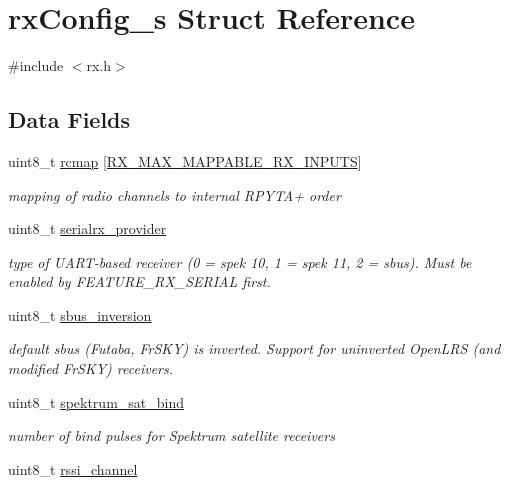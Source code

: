 \hypertarget{structrxConfig__s}{\section{rx\+Config\+\_\+s Struct Reference}
\label{structrxConfig__s}
}


{\ttfamily \#include $<$rx.\+h$>$}

\subsection*{Data Fields}
\begin{DoxyCompactItemize}
\item 
uint8\+\_\+t \hyperlink{structrxConfig__s_a4a6452d61a6fee066a8bb12032c3a8d1}{rcmap} \mbox{[}\hyperlink{config_2rx_8h_a2ef9ea7cd22f2ca36356809255c981ba}{R\+X\+\_\+\+M\+A\+X\+\_\+\+M\+A\+P\+P\+A\+B\+L\+E\+\_\+\+R\+X\+\_\+\+I\+N\+P\+U\+T\+S}\mbox{]}
\begin{DoxyCompactList}\small\item\em mapping of radio channels to internal R\+P\+Y\+T\+A+ order \end{DoxyCompactList}\item 
uint8\+\_\+t \hyperlink{structrxConfig__s_a07206bf99d4d97e08c39f911c5a5c3d1}{serialrx\+\_\+provider}
\begin{DoxyCompactList}\small\item\em type of U\+A\+R\+T-\/based receiver (0 = spek 10, 1 = spek 11, 2 = sbus). Must be enabled by F\+E\+A\+T\+U\+R\+E\+\_\+\+R\+X\+\_\+\+S\+E\+R\+I\+A\+L first. \end{DoxyCompactList}\item 
uint8\+\_\+t \hyperlink{structrxConfig__s_a9c318cd868cdf79b98c96bb61c181c92}{sbus\+\_\+inversion}
\begin{DoxyCompactList}\small\item\em default sbus (Futaba, Fr\+S\+K\+Y) is inverted. Support for uninverted Open\+L\+R\+S (and modified Fr\+S\+K\+Y) receivers. \end{DoxyCompactList}\item 
uint8\+\_\+t \hyperlink{structrxConfig__s_ae7f99ea1200fd047ae4e510f46ecbcba}{spektrum\+\_\+sat\+\_\+bind}
\begin{DoxyCompactList}\small\item\em number of bind pulses for Spektrum satellite receivers \end{DoxyCompactList}\item 
uint8\+\_\+t \hyperlink{structrxConfig__s_a50bbac4beb27d371543e0ecab9bb7e24}{rssi\+\_\+channel}

\end{DoxyCompactItemize}
